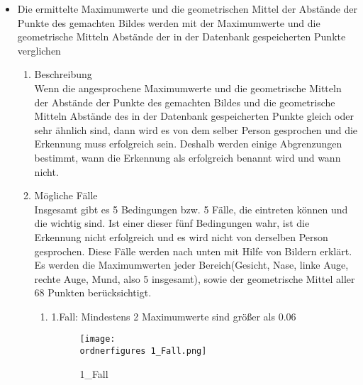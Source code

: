 \begin{enumerate}
\begin{itemize}
	Die untere Codeabschnitt zeigt wie dieser Schritt für die ersten 27 Punkte programmiert wird(nur um eine Idee zu haben, wie es funktioniert)\\
	
\begin{lstlisting}
for pika in range(0,27):
dis=math.sqrt(abs(( (vleratx.item(pika)-float(res[vx])))) * abs( 
(vleratx.item(pika)-float(res[vx])) ) + ( 
abs((vleraty.item(pika)-float(res[vy]))) * 
abs((vleraty.item(pika)-float(res[vy])) ) ))
gm *= dis
vx+=2
vy+=2
gm=gm**(1/27)    
print("GM:%s\n"%(gm))
gm=1
dis=0
\end{lstlisting}
	
	\item Die ermittelte Maximumwerte und die geometrischen Mittel der Abstände der Punkte des gemachten Bildes werden mit der Maximumwerte und die geometrische Mitteln Abstände der in der Datenbank gespeicherten Punkte verglichen \\
	
	\begin{enumerate}
		\item Beschreibung \\
		
		Wenn die angesprochene Maximumwerte und die geometrische Mitteln der Abstände der Punkte des gemachten Bildes und die geometrische Mitteln Abstände des in der Datenbank gespeicherten Punkte gleich oder sehr ähnlich sind, dann wird es von dem selber Person gesprochen und die Erkennung muss erfolgreich sein. Deshalb werden einige Abgrenzungen bestimmt, wann die Erkennung als erfolgreich benannt wird und wann nicht.
		
		\item Mögliche Fälle \\
		
		Insgesamt gibt es 5 Bedingungen bzw. 5 Fälle, die eintreten können und die wichtig sind. Ist einer dieser fünf Bedingungen wahr, ist die Erkennung nicht erfolgreich und es wird nicht von derselben Person gesprochen. Diese Fälle werden nach unten mit Hilfe von Bildern erklärt. Es werden die Maximumwerten jeder Bereich(Gesicht, Nase, linke Auge, rechte Auge, Mund, also 5 insgesamt), sowie der geometrische Mittel aller 68 Punkten berücksichtigt.
		
		\begin{enumerate}
			\item 1.Fall: Mindestens 2 Maximumwerte sind größer als 0.06 \\
			
				\begin{figure}[H]
				\centering
				\texttt{[image: \\ordnerfigures 1\_Fall.png]}
				\caption{1\_Fall}
				\label{fig:1_Fall}
			\end{figure}
			

\end{enumerate}
\end{enumerate}
\end{itemize}
\end{enumerate}
